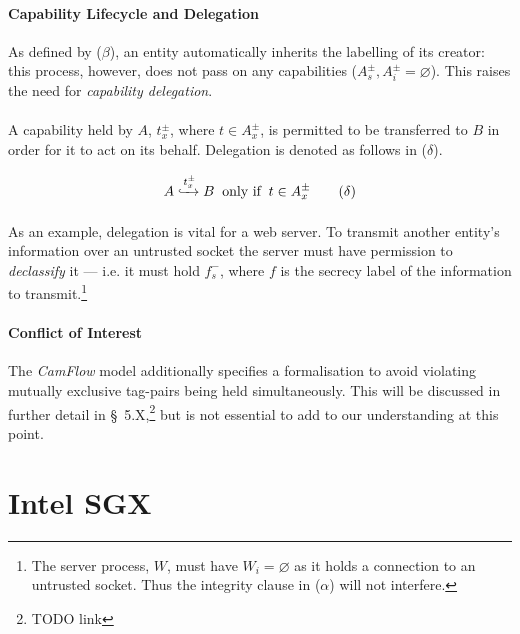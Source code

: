 \paragraph{Capability Lifecycle and Delegation} As defined by ($\beta$), an entity automatically inherits the labelling of its creator: this process, however, does not pass on any capabilities ($A_{s}^{\pm}, A_{i}^{\pm} = \varnothing$). This raises the need for \textit{capability delegation}.

\paragraph{} A capability held by $A$, $t_{x}^{\pm}$, where $t \in A_{x}^{\pm}$, is permitted to be transferred to $B$ in order for it to act on its behalf. Delegation is denoted as follows in ($\delta$).


\begin{equation}
    A \xhookrightarrow[]{t^{\pm}_{x}} B \;\; \text{only if} \;\; t \in A_{x}^{\pm} \tag{$\delta$}
\end{equation}

\paragraph{} As an example, delegation is vital for a web server. To transmit another entity's information over an untrusted socket the server must have permission to \textit{declassify} it --- i.e. it must hold $f_{s}^{-}$, where $f$ is the secrecy label of the information to transmit.\footnote{The server process, $W$, must have $W_{i} = \varnothing$ as it holds a connection to an untrusted socket. Thus the integrity clause in ($\alpha$) will not interfere.}

\paragraph{Conflict of Interest} The \textit{CamFlow} model additionally specifies a formalisation to avoid violating mutually exclusive tag-pairs being held simultaneously. This will be discussed in further detail in §~5.X,\footnote{TODO link} but is not essential to add to our understanding at this point.




\section{Intel SGX}

